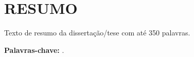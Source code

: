 \chapter*{RESUMO}
\label{resumo}

Texto de resumo da dissertação/tese com até 350 palavras.

\vspace{1cm}

\noindent\textbf{Palavras-chave:} \palavraschave.
